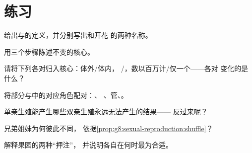 \section{练习}

\begin{exercise}[$\star$]\label{exo:g8:sexual-reproduction:1}
给出与的定义，并分别写出和开花
的两种名称。
\end{exercise}

\begin{exercise}[$\star$]\label{exo:g8:sexual-reproduction:2}
用三个步骤陈述不变的核心。
\end{exercise}

\begin{exercise}[$\star$]\label{exo:g8:sexual-reproduction:3}
请将下列各对归入核心：体外/体内，
/，数以百万计/仅一个——各对
变化的是什么？
\end{exercise}

\begin{exercise}[$\star$]\label{exo:g8:sexual-reproduction:4}
将部分与中的对应角色配对：、
、管、。
\end{exercise}

\begin{exercise}[$\star$]\label{exo:g8:sexual-reproduction:5}
单亲生殖能产生哪些双亲生殖永远无法产生的结果——
反过来呢？
\end{exercise}

\begin{exercise}[$\star$]\label{exo:g8:sexual-reproduction:6}
兄弟姐妹为何彼此不同，
依据\cref{prop:g8:sexual-reproduction:shuffle}？
\end{exercise}

\begin{exercise}[$\star\star$]\label{exo:g8:sexual-reproduction:7}
解释果园的两种“押注”，
并说明各自在何时最为合适。
\end{exercise}

